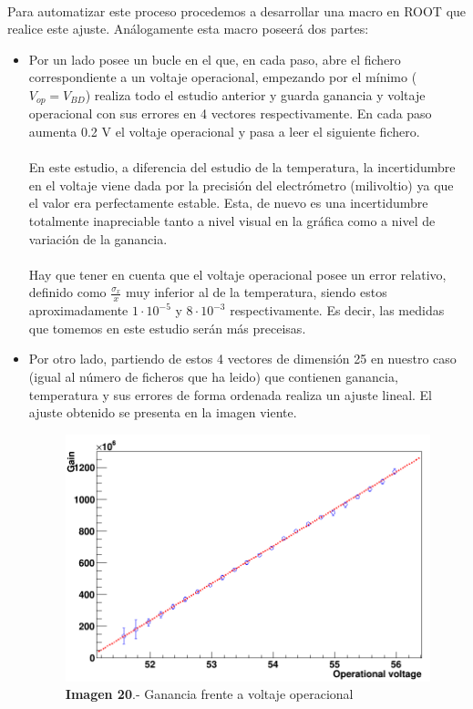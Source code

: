 \documentclass[11pt, a4paper]{article}
\begin{document}
\paragraph {}
Para automatizar este proceso procedemos a desarrollar una macro en ROOT que realice este ajuste. Análogamente esta macro poseerá dos partes:
\begin{itemize}
\item{} Por un lado posee un bucle en el que, en cada paso, abre el fichero correspondiente a un voltaje operacional, empezando por el mínimo ($V_{op}=V_{BD}$) realiza todo el estudio anterior y guarda ganancia y voltaje operacional con sus errores en 4 vectores respectivamente. En cada paso aumenta 0.2 V el voltaje operacional y pasa a leer el siguiente fichero. 

\paragraph {}
En este estudio, a diferencia del estudio de la temperatura, la incertidumbre en el voltaje viene dada por la precisión del electrómetro (milivoltio) ya que el valor era perfectamente estable. Esta, de nuevo es una incertidumbre totalmente inapreciable tanto a nivel visual en la gráfica como a nivel de variación de la ganancia. 
\paragraph {}
Hay que tener en cuenta que el voltaje operacional posee un error relativo, definido como $\frac{\sigma_x}{x}$ muy inferior al de la temperatura, siendo estos aproximadamente $1 \cdot 10^{-5}$ y $8 \cdot 10^{-3}$ respectivamente. Es decir, las medidas que tomemos en este estudio serán más preceisas.

\item {} Por otro lado, partiendo de estos 4 vectores de dimensión 25 en nuestro caso (igual al número de ficheros que ha leido) que contienen ganancia, temperatura y sus errores de forma ordenada realiza un ajuste lineal. El ajuste obtenido se presenta en la imagen viente.

\begin{figure}[hbtp]
\centering
\includegraphics[scale=0.2]{Dependenciavoltaje.png}
\caption{\textbf{Imagen 20}.- Ganancia frente a voltaje operacional}
\end{figure}


\end{itemize}
\end{document}
